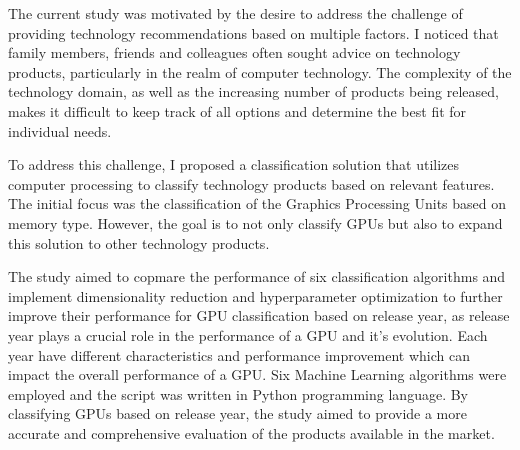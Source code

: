 \documentclass[conference,onecolumn]{IEEEtran}
\begin{document}
The current study was motivated by the desire to address the challenge of providing technology recommendations based on multiple factors. I noticed that family members, friends and colleagues often sought advice on technology products, particularly in the realm of computer technology. The complexity of the technology domain, as well as the increasing number of products being released, makes it difficult to keep track of all options and determine the best fit for individual needs.

To address this challenge, I proposed a classification solution that utilizes computer processing to classify technology products based on relevant features. The initial focus was the classification of the Graphics Processing Units based on memory type. However, the goal is to not only classify GPUs but also to expand this solution to other technology products.

The study aimed to copmare the performance of six classification algorithms and implement dimensionality reduction and hyperparameter optimization to further improve their performance for GPU classification based on release year, as release year plays a crucial role in the performance of a GPU and it's evolution. Each year have different characteristics and performance improvement which can impact the overall performance of a GPU. Six Machine Learning algorithms were employed and the script was written in Python programming language. By classifying GPUs based on release year, the study aimed to provide a more accurate and comprehensive evaluation of the products available in the market.
\end{document}
